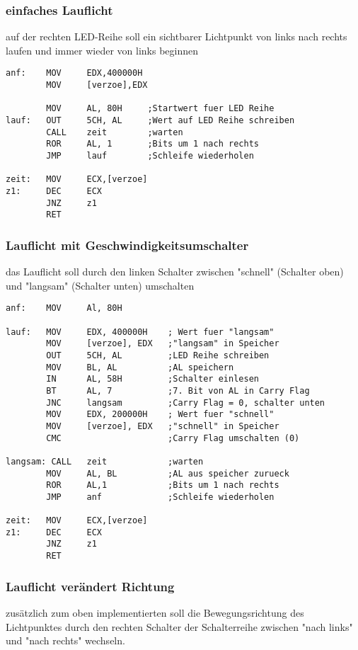 \documentclass[a4paper,10pt,titlepage]{scrartcl}
\begin{document}
\subsubsection*{einfaches Lauflicht}
auf der rechten LED-Reihe soll ein sichtbarer Lichtpunkt von links nach rechts laufen und immer wieder von links beginnen

\begin{lstlisting}
anf:    MOV     EDX,400000H
        MOV     [verzoe],EDX

        MOV     AL, 80H     ;Startwert fuer LED Reihe
lauf:   OUT     5CH, AL     ;Wert auf LED Reihe schreiben
        CALL    zeit        ;warten
        ROR     AL, 1       ;Bits um 1 nach rechts 
        JMP     lauf        ;Schleife wiederholen

zeit:   MOV     ECX,[verzoe]
z1:     DEC     ECX
        JNZ     z1
        RET
\end{lstlisting}

\subsubsection*{Lauflicht mit Geschwindigkeitsumschalter}
das Lauflicht soll durch den linken Schalter zwischen "schnell" (Schalter oben) und "langsam" (Schalter unten) umschalten

\begin{lstlisting}
anf:    MOV     Al, 80H

lauf:   MOV     EDX, 400000H    ; Wert fuer "langsam"
        MOV     [verzoe], EDX   ;"langsam" in Speicher
        OUT     5CH, AL         ;LED Reihe schreiben
        MOV     BL, AL          ;AL speichern
        IN      AL, 58H         ;Schalter einlesen
        BT      AL, 7           ;7. Bit von AL in Carry Flag
        JNC     langsam         ;Carry Flag = 0, schalter unten
        MOV     EDX, 200000H    ; Wert fuer "schnell"
        MOV     [verzoe], EDX   ;"schnell" in Speicher
        CMC                     ;Carry Flag umschalten (0)

langsam: CALL   zeit            ;warten
        MOV     AL, BL          ;AL aus speicher zurueck
        ROR     AL,1            ;Bits um 1 nach rechts
        JMP     anf             ;Schleife wiederholen

zeit:   MOV     ECX,[verzoe]
z1:     DEC     ECX
        JNZ     z1
        RET
\end{lstlisting}

\subsubsection*{Lauflicht verändert Richtung}
zusätzlich zum oben implementierten soll die Bewegungsrichtung des Lichtpunktes durch den rechten Schalter der Schalterreihe zwischen "nach links" und "nach rechts" wechseln.
\end{document}
